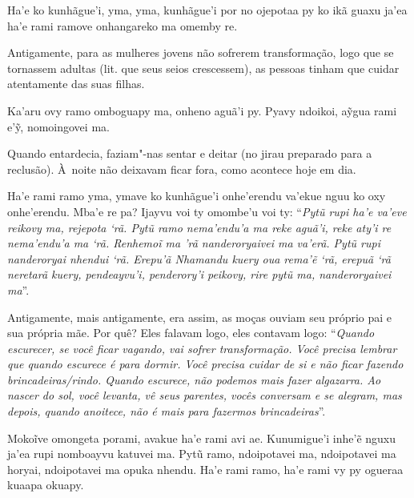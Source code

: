 \begin{paracol}{2}
\footnotesize
\bigskip

\noindent
Ha’e ko kunhãgue’i, yma, yma, kunhãgue’i por no ojepotaa py ko ikã guaxu
ja’ea ha’e rami ramove onhangareko ma omemby re. 

\bigskip

\switchcolumn
\noindent
Antigamente, para as mulheres jovens não sofrerem transformação, logo
que se tornassem adultas (lit. que seus seios crescessem), as pessoas
tinham que cuidar atentamente das suas filhas. 

\smallskip

\switchcolumn
\noindent
Ka'aru ovy ramo omboguapy ma, onheno aguã'i py. Pyavy ndoikoi, aỹgua
rami e'ỹ, nomoingovei ma. 

\bigskip

\switchcolumn
\noindent
Quando entardecia, faziam"-nas sentar e deitar (no jirau preparado para a
reclusão). À~noite não deixavam ficar fora, como acontece hoje em dia. 

\smallskip

\switchcolumn
\noindent
Ha'e rami ramo yma, ymave ko kunhãgue'i onhe'erendu va'ekue nguu ko oxy
onhe'erendu. Mba'e re pa? Ijayvu voi ty omombe'u voi ty: ``\emph{Pytũ
rupi ha'e va'eve reikovy ma, rejepota `rã. Pytũ ramo nema'endu'a ma reke
aguã'i, reke aty'i re nema'endu'a ma `rã. Renhemoĩ ma 'rã nanderoryaivei
ma va'erã. Pytũ rupi nanderoryai nhendui `rã. Erepu'ã Nhamandu kuery oua
rema'ẽ `rã, erepuã `rã neretarã kuery, pendeayvu'i, penderory'i peikovy,
rire pytũ ma, nanderoryaivei ma}''. 

\bigskip

\switchcolumn
\noindent
Antigamente, mais antigamente, era assim, as moças ouviam seu próprio
pai e sua própria mãe. Por quê? Eles falavam logo, eles contavam logo:
``\emph{Quando escurecer, se você ficar vagando, vai sofrer
transformação. Você precisa lembrar que quando escurece é para dormir.
Você precisa cuidar de si e não ficar fazendo brincadeiras/rindo. Quando
escurece, não podemos mais fazer algazarra. Ao nascer do sol, você
levanta, vê seus parentes, vocês conversam e se alegram, mas depois,
quando anoitece, não é mais para fazermos brincadeiras}''.

\smallskip

\switchcolumn
\noindent
Mokoĩve omongeta porami, avakue ha'e rami avi ae. Kunumigue'i inhe'ẽ
nguxu ja'ea rupi nomboayvu katuvei ma. Pytũ ramo, ndoipotavei ma,
ndoipotavei ma horyai, ndoipotavei ma opuka nhendu. Ha'e rami ramo, ha'e
rami vy py ogueraa kuaapa okuapy.


\end{paracol}
